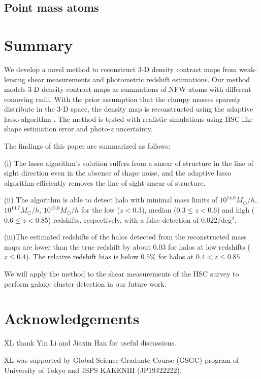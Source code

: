 \documentclass[twocolumn]{aastex63}
\begin{document}
\subsection{Point mass atoms}
\label{subsec_test-pm}




\section{Summary}
\label{sec_Sum}

We develop a novel method to reconstruct $3$-D density contrast maps from
weak-lensing shear measurements and photometric redshift estimations.  Our
method models $3$-D density contrast maps as summations of NFW atoms with
different comoving radii.  With the prior assumption that the clumpy masses
sparsely distribute in the $3$-D space, the density map is reconstructed
using the adaptive lasso algorithm \citep{AdaLASSO-Zou2006}. The method is
tested with realistic simulations using HSC-like shape estimation error and
photo-$z$ uncertainty.

The findings of this paper are summarized as follows:

(i) The lasso algorithm's solution suffers from a smear of structure in the
line of sight direction even in the absence of shape noise, and the adaptive
lasso algorithm efficiently removes the line of sight smear of structure.

(ii) The algorithm is able to detect halo with minimal mass limits of
$10^{14.0} M_{\odot}/h$, $10^{14.7} M_{\odot}/h$, $10^{15.0} M_{\odot}/h$ for
the low ($z<0.3$), median ($0.3\leq z< 0.6$) and high ($0.6\leq z< 0.85$)
redshifts, respectively, with a false detection of 0.022/deg$^2$.

(iii)The estimated redshifts of the halos detected from the reconstructed mass
maps are lower than the true redshift by about $0.03$ for halos at low
redshifts ($z\leq 0.4$).  The relative redshift bias is below $0.5\%$ for halos
at $0.4<z\leq 0.85$.

We will apply the method to the shear measurements of the HSC survey
\citep{HSC1-catalog,FPFSHSC1-Li2020} to perform galaxy cluster detection in our
future work.

\section*{Acknowledgements}
XL thank Yin Li and Jiaxin Han for useful discussions.

XL was supported by Global Science Graduate Course (GSGC) program of
University of Tokyo and JSPS KAKENHI (JP19J22222).


\end{document}
